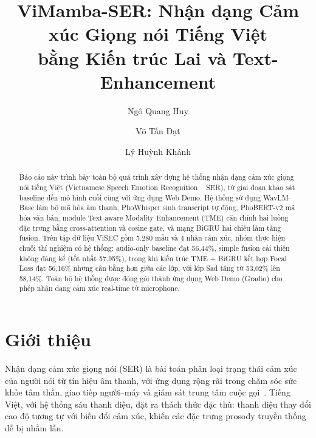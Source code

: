\documentclass[runningheads]{llncs}
\begin{document}
\title{ViMamba-SER: Nhận dạng Cảm xúc Giọng nói Tiếng Việt\\
bằng Kiến trúc Lai và Text-Enhancement}


\author{Ngô Quang Huy \and
        Võ Tấn Đạt \and
        Lý Huỳnh Khánh}

\maketitle

\begin{abstract}
Báo cáo này trình bày toàn bộ quá trình xây dựng hệ thống nhận dạng cảm xúc
giọng nói tiếng Việt (Vietnamese Speech Emotion Recognition -- SER), từ giai
đoạn khảo sát baseline đến mô hình cuối cùng với ứng dụng Web Demo.
Hệ thống sử dụng WavLM-Base làm bộ mã hóa âm thanh, PhoWhisper sinh
transcript tự động, PhoBERT-v2 mã hóa văn bản, module Text-aware Modality
Enhancement (TME) căn chỉnh hai luồng đặc trưng bằng cross-attention và
cosine gate, và mạng BiGRU hai chiều làm tầng fusion.
Trên tập dữ liệu ViSEC gồm 5.280 mẫu và 4 nhãn cảm xúc, nhóm thực hiện
chuỗi thí nghiệm có hệ thống: audio-only baseline đạt 56,44\%,
simple fusion cải thiện không đáng kể (tốt nhất 57,95\%), trong khi kiến trúc
TME + BiGRU kết hợp Focal Loss đạt 56,16\% nhưng cân bằng hơn giữa các lớp,
với lớp Sad tăng từ 53,02\% lên 58,14\%.
Toàn bộ hệ thống được đóng gói thành ứng dụng Web Demo (Gradio) cho phép
nhận dạng cảm xúc real-time từ microphone.

\end{abstract}

\section{Giới thiệu}
\label{sec:intro}

Nhận dạng cảm xúc giọng nói (SER) là bài toán phân loại trạng thái cảm xúc
của người nói từ tín hiệu âm thanh, với ứng dụng rộng rãi trong chăm sóc
sức khỏe tâm thần, giao tiếp người--máy và giám sát trung tâm cuộc
gọi~\cite{vnemos2024}.
Tiếng Việt, với hệ thống sáu thanh điệu, đặt ra thách thức đặc thù:
thanh điệu thay đổi cao độ tương tự với biến đổi cảm xúc, khiến các đặc
trưng prosody truyền thống dễ bị nhầm lẫn.
\end{document}
